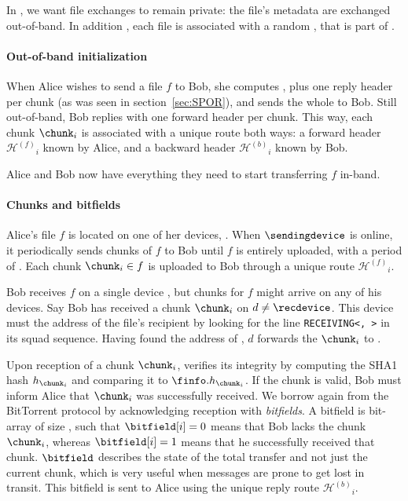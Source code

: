 In \name, we want file exchanges to remain private: the file's metadata are exchanged out-of-band.
In addition , each file is associated with a random \fileid, that is part of \finfo.

\newcommand\forwardheader{\ensuremath{\mathcal{H}^{(f)}}}
\newcommand\backwardheader{\ensuremath{\mathcal{H}^{(b)}}}

\paragraph*{Out-of-band initialization} 
When Alice wishes to send a file $f$ to Bob, she computes \finfo, 
plus one reply header per chunk (as was seen in section~\ref{sec:SPOR}), and sends the whole to Bob.
Still out-of-band, Bob replies with one forward header per chunk.
This way, each chunk $\chunk_i$ is associated with a unique route both ways: 
a forward header $\forwardheader_i$ known by Alice, and a backward header $\backwardheader_i$ known by Bob.

Alice and Bob now have everything they need to start transferring $f$ in-band.


\paragraph*{Chunks and bitfields}
Alice's file $f$ is located on one of her devices, \sendingdevice. 
When $\sendingdevice$ is online, it periodically sends chunks of $f$ to Bob until $f$ is entirely uploaded, with a period of \tupload.
Each chunk $\chunk_i \in f$ is uploaded to Bob through a unique route $\forwardheader_i$.

Bob receives $f$ on a single device \recdevice, but chunks for $f$ might arrive on any of his devices.
Say Bob has received a chunk $\chunk_i$ on $d \neq \recdevice$.
This device must the address of the file's recipient \recdevice by looking for the line \texttt{RECEIVING<\recdevice, \fileid>} in its squad sequence.
Having found the address of \recdevice, $d$ forwards the $\chunk_i$ to \recdevice.

Upon reception of a chunk $\chunk_i$, \recdevice verifies its integrity by computing the SHA1 hash $h_{\chunk_i}$ and comparing it to $\finfo.h_{\chunk_i}$.
If the chunk is valid, Bob must inform Alice that $\chunk_i$ was successfully received.
We borrow again from the BitTorrent protocol by acknowledging reception with \emph{bitfields}.
A bitfield \bitfield is bit-array of size \nchunks, such that $\bitfield[i] = 0$ means that Bob lacks the chunk $\chunk_i$, whereas $\bitfield[i] = 1$ means that he successfully received that chunk.
$\bitfield$ describes the state of the total transfer and not just the current chunk, which is very useful when messages are prone to get lost in transit. 
This bitfield is sent to Alice using the unique reply route $\backwardheader_i$.

